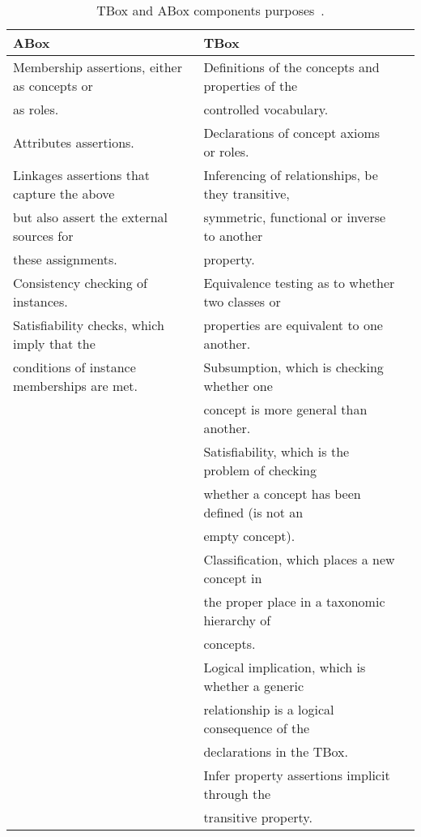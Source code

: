 \begin{table}[H]
 \caption{TBox and ABox components purposes~\citep{abox_tbox}.}
 \label{tbl:dl_terminology}
 \footnotesize
 \centering
\begin{tabular}{l l l}
  \hline 
  \textbf{ABox} 				&  \textbf{TBox} \\
  \hline 
  Membership assertions, either as concepts or  & Definitions of the concepts and properties of the 	\\
  as roles. 					& controlled vocabulary.				\\
  Attributes assertions. 			& Declarations of concept axioms or roles.		\\
  Linkages assertions that capture the above	& Inferencing of relationships, be they transitive, 	\\
  but also assert the external sources for 	& symmetric, functional or inverse to another 		\\
  these assignments. 				& property.						\\
  Consistency checking of instances.		& Equivalence testing as to whether two classes or 	\\
  Satisfiability checks, which imply that the	& properties are equivalent to one another.		\\
  conditions of instance memberships are met.	& Subsumption, which is checking whether one 		\\
						& concept is more general than another.			\\
						& Satisfiability, which is the problem of checking 	\\
						& whether a concept has been defined (is not an 	\\
						& empty concept).					\\
						& Classification, which places a new concept in  	\\
						& the proper place in a taxonomic hierarchy of 		\\
						& concepts.						\\
						& Logical implication, which is whether a generic 	\\
						& relationship is a logical consequence of the		\\ 
						& declarations in the TBox.				\\
						& Infer property assertions implicit through the 	\\
						& transitive property.					\\	
\hline
\end{tabular}
\end{table}